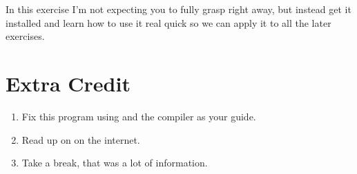 In this exercise I'm not expecting you to fully grasp  right
away, but instead get it installed and learn how to use it real quick so we
can apply it to all the later exercises.

\section{Extra Credit}

\begin{enumerate}
\item Fix this program using  and the compiler as your guide.
\item Read up on  on the internet.
\item Take a break, that was a lot of information.
\end{enumerate}


